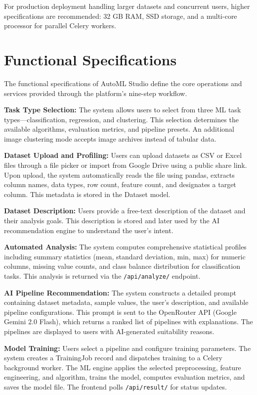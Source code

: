 \documentclass[12pt,a4paper]{report}
\begin{document}
For production deployment handling larger datasets and concurrent users, higher specifications are recommended: 32 GB RAM, SSD storage, and a multi-core processor for parallel Celery workers.

\section{Functional Specifications}

The functional specifications of AutoML Studio define the core operations and services provided through the platform's nine-step workflow.

\textbf{Task Type Selection:} The system allows users to select from three ML task types—classification, regression, and clustering. This selection determines the available algorithms, evaluation metrics, and pipeline presets. An additional image clustering mode accepts image archives instead of tabular data.

\textbf{Dataset Upload and Profiling:} Users can upload datasets as CSV or Excel files through a file picker or import from Google Drive using a public share link. Upon upload, the system automatically reads the file using pandas, extracts column names, data types, row count, feature count, and designates a target column. This metadata is stored in the Dataset model.

\textbf{Dataset Description:} Users provide a free-text description of the dataset and their analysis goals. This description is stored and later used by the AI recommendation engine to understand the user's intent.

\textbf{Automated Analysis:} The system computes comprehensive statistical profiles including summary statistics (mean, standard deviation, min, max) for numeric columns, missing value counts, and class balance distribution for classification tasks. This analysis is returned via the \texttt{/api/analyze/} endpoint.

\textbf{AI Pipeline Recommendation:} The system constructs a detailed prompt containing dataset metadata, sample values, the user's description, and available pipeline configurations. This prompt is sent to the OpenRouter API (Google Gemini 2.0 Flash), which returns a ranked list of pipelines with explanations. The pipelines are displayed to users with AI-generated suitability reasons.

\textbf{Model Training:} Users select a pipeline and configure training parameters. The system creates a TrainingJob record and dispatches training to a Celery background worker. The ML engine applies the selected preprocessing, feature engineering, and algorithm, trains the model, computes evaluation metrics, and saves the model file. The frontend polls \texttt{/api/result/} for status updates.
\end{document}
